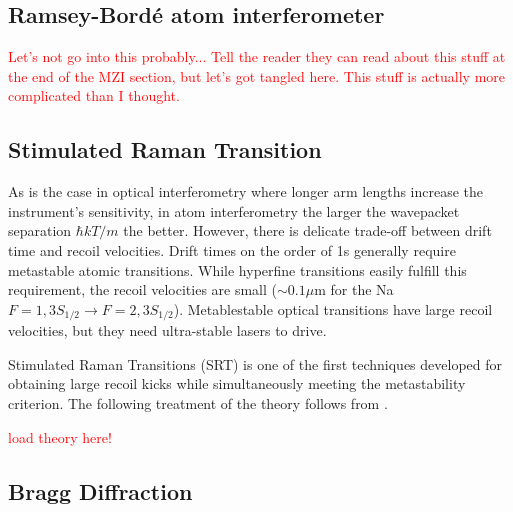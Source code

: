 \documentclass[reprint,
nofootinbib,
amsmath,amssymb,
aps]{revtex4-1}
\begin{document}
\subsection{Ramsey-Bord\'{e} atom interferometer}\label{sect:RBI}

\textcolor{red}{Let's not go into this probably... Tell the reader they can read about  this stuff at the end of the MZI section, but let's got tangled here. This stuff is actually more complicated than I thought.}

\subsection{Stimulated Raman Transition}\label{sect:SRT}



As is the case in optical interferometry where longer arm lengths increase the instrument's sensitivity, in atom interferometry the larger the wavepacket separation $\hbar k T /m$ the better. However, there is delicate trade-off between drift time and recoil velocities. Drift times on the order of 1s generally require metastable atomic transitions. While hyperfine transitions easily fulfill this requirement, the recoil velocities are small ($\sim 0.1 \mu\text{m}$ for the Na $F=1, 3S_{1/2}\to F=2,3S_{1/2}$). Metablestable optical transitions have large recoil velocities, but they need ultra-stable lasers to drive. 


Stimulated Raman Transitions (SRT) is one of the first techniques developed for obtaining large recoil kicks while simultaneously meeting the metastability criterion. The following treatment of the theory follows from \cite{kasevich1992measurement}. 



\textcolor{red}{load theory here!}


\subsection{Bragg Diffraction}\label{sect:BD}
\end{document}
